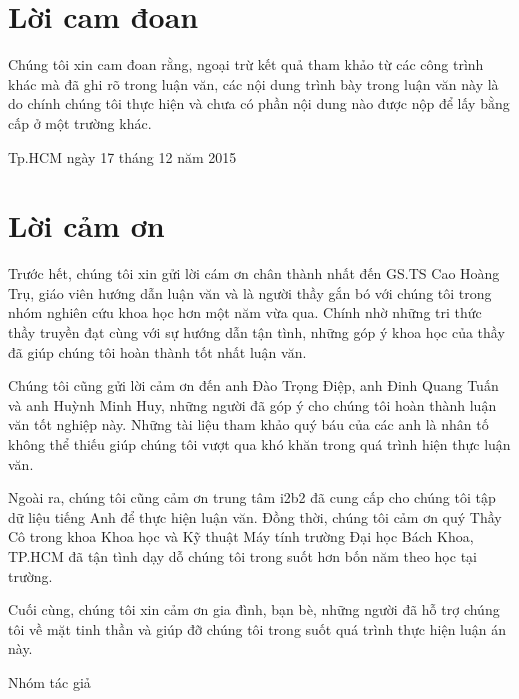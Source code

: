 \documentclass[12pt,a4paper,twoside]{report}
\begin{document}


\chapter*{Lời cam đoan}
Chúng tôi xin cam đoan rằng, ngoại trừ kết quả tham khảo từ các công trình khác mà đã ghi rõ trong luận văn, các nội dung trình bày trong luận văn này là do chính chúng tôi thực hiện và chưa có phần nội dung nào được nộp để lấy bằng cấp ở một trường khác.

\begin{flushright}
Tp.HCM ngày 17 tháng 12 năm 2015
\end{flushright}

\chapter*{Lời cảm ơn}
Trước hết, chúng tôi xin gửi lời cám ơn chân thành nhất đến GS.TS Cao Hoàng Trụ, giáo viên hướng dẫn luận văn và là người thầy gắn bó với chúng tôi trong nhóm nghiên cứu khoa học hơn một năm vừa qua. Chính nhờ những tri thức thầy truyền đạt cùng với sự hướng dẫn tận tình, những góp ý khoa học của thầy đã giúp chúng tôi hoàn thành tốt nhất luận văn.

Chúng tôi cũng gửi lời cảm ơn đến anh Đào Trọng Điệp, anh Đinh Quang Tuấn và anh Huỳnh Minh Huy, những người đã góp ý cho chúng tôi hoàn thành luận văn tốt nghiệp này. Những tài liệu tham khảo quý báu của các anh là nhân tố không thể thiếu giúp chúng tôi vượt qua khó khăn trong quá trình hiện thực luận văn.

Ngoài ra, chúng tôi cũng cảm ơn trung tâm i2b2 đã cung cấp cho chúng tôi tập dữ liệu tiếng Anh để thực hiện luận văn. Đồng thời, chúng tôi cảm ơn quý Thầy Cô trong khoa Khoa học và Kỹ thuật Máy tính trường Đại học Bách Khoa, TP.HCM đã tận tình dạy dỗ chúng tôi trong suốt hơn bốn năm theo học tại trường.

Cuối cùng, chúng tôi xin cảm ơn gia đình, bạn bè, những người đã hỗ trợ chúng tôi về mặt tinh thần và giúp đỡ chúng tôi trong suốt quá trình thực hiện luận án này.

\begin{flushright}
Nhóm tác giả
\end{flushright}
\end{document}

